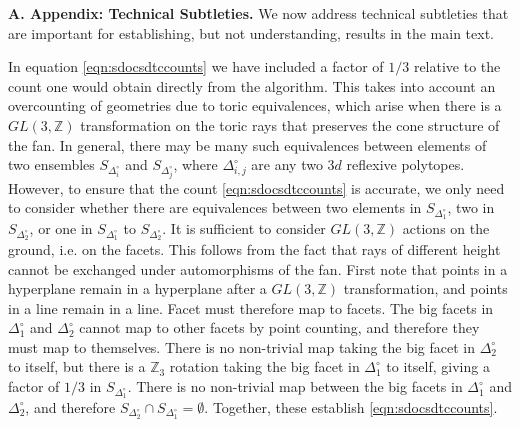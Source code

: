 \documentclass[aps,prl,twocolumn, superscriptaddress,groupedaddress,nofootinbib]{revtex4-1}
\newcommand{\bZ}{\mathbb{Z}}
\newcommand{\sdoc}{S_{\Delta_1^\circ}}
\newcommand{\sdtc}{S_{\Delta_2^\circ}}
\newcommand{\doc}{{\Delta_1^\circ}}
\newcommand{\dtc}{{\Delta_2^\circ}}
\newcommand{\XXX}[3]{}
\begin{document}
\XXX{cl}{jh}{Tightened the text a bit, and only removed ideas that we might not want
to let out of the bag.}

\vspace{.2cm}
\noindent \textbf{A. Appendix: Technical Subtleties.} We now
address technical subtleties that are important for establishing,
but not understanding, results in the main text.

In equation \eqref{eqn:sdocsdtccounts} 
we have included a factor of
$1/3$ relative to the count one would obtain directly from the algorithm.
This takes into account an overcounting of geometries due to toric equivalences,
which arise when there is a $GL(3,\bZ)$ transformation on the toric rays
that preserves the cone structure of the fan. In general, there may
be many such equivalences between elements of two ensembles $S_{\Delta_i^\circ}$
and $S_{\Delta_j^\circ}$, where $\Delta_{i,j}^\circ$ are any two $3d$ reflexive
polytopes. However, to ensure that the count  \eqref{eqn:sdocsdtccounts} is accurate,
we only need to consider whether there are equivalences between
two elements in $\sdoc$, two in $\sdtc$, or one in $\sdoc$ to $\sdtc$. It is sufficient to consider $GL(3,\bZ)$ actions
on the ground, i.e. on the facets. This follows from the fact that rays of different height cannot be exchanged under automorphisms of the fan. First note that points in a hyperplane remain in a
hyperplane after a $GL(3,\bZ)$ transformation, and points
in a line remain in a line. Facet must therefore map to
facets. The big facets in $\doc$ and $\dtc$ cannot map
to other facets by point counting, and therefore they
must map to themselves. There is no non-trivial map
taking the big facet in $\dtc$ to itself, but there is
a $\bZ_3$ rotation taking the big facet in $\doc$ to itself, giving a factor of $1/3$ in $\sdoc$. There is no non-trivial
map between the big facets in $\doc$ and $\dtc$, and therefore
$\sdtc\cap \sdoc  = \emptyset.$ Together, these establish
\eqref{eqn:sdocsdtccounts}.

\end{document}
